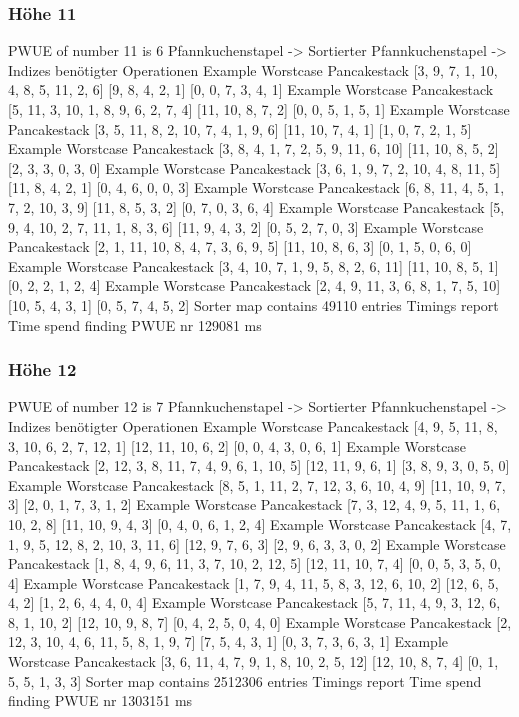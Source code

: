 {    \subsubsection{Höhe 11}

    PWUE of number 11 is 6
    Pfannkuchenstapel -> Sortierter Pfannkuchenstapel -> Indizes benötigter Operationen
Example Worstcase Pancakestack
    [3, 9, 7, 1, 10, 4, 8, 5, 11, 2, 6]
    [9, 8, 4, 2, 1]
    [0, 0, 7, 3, 4, 1]
    Example Worstcase Pancakestack
    [5, 11, 3, 10, 1, 8, 9, 6, 2, 7, 4]
    [11, 10, 8, 7, 2]
    [0, 0, 5, 1, 5, 1]
    Example Worstcase Pancakestack
    [3, 5, 11, 8, 2, 10, 7, 4, 1, 9, 6]
    [11, 10, 7, 4, 1]
    [1, 0, 7, 2, 1, 5]
    Example Worstcase Pancakestack
    [3, 8, 4, 1, 7, 2, 5, 9, 11, 6, 10]
    [11, 10, 8, 5, 2]
    [2, 3, 3, 0, 3, 0]
    Example Worstcase Pancakestack
    [3, 6, 1, 9, 7, 2, 10, 4, 8, 11, 5]
    [11, 8, 4, 2, 1]
    [0, 4, 6, 0, 0, 3]
    Example Worstcase Pancakestack
    [6, 8, 11, 4, 5, 1, 7, 2, 10, 3, 9]
    [11, 8, 5, 3, 2]
    [0, 7, 0, 3, 6, 4]
    Example Worstcase Pancakestack
    [5, 9, 4, 10, 2, 7, 11, 1, 8, 3, 6]
    [11, 9, 4, 3, 2]
    [0, 5, 2, 7, 0, 3]
    Example Worstcase Pancakestack
    [2, 1, 11, 10, 8, 4, 7, 3, 6, 9, 5]
    [11, 10, 8, 6, 3]
    [0, 1, 5, 0, 6, 0]
    Example Worstcase Pancakestack
    [3, 4, 10, 7, 1, 9, 5, 8, 2, 6, 11]
    [11, 10, 8, 5, 1]
    [0, 2, 2, 1, 2, 4]
    Example Worstcase Pancakestack
    [2, 4, 9, 11, 3, 6, 8, 1, 7, 5, 10]
    [10, 5, 4, 3, 1]
    [0, 5, 7, 4, 5, 2]
    Sorter map contains 49110 entries
    Timings report
    Time spend finding PWUE nr 129081 ms
    \subsubsection{Höhe 12}

    PWUE of number 12 is 7
    Pfannkuchenstapel -> Sortierter Pfannkuchenstapel -> Indizes benötigter Operationen
Example Worstcase Pancakestack
    [4, 9, 5, 11, 8, 3, 10, 6, 2, 7, 12, 1]
    [12, 11, 10, 6, 2]
    [0, 0, 4, 3, 0, 6, 1]
    Example Worstcase Pancakestack
    [2, 12, 3, 8, 11, 7, 4, 9, 6, 1, 10, 5]
    [12, 11, 9, 6, 1]
    [3, 8, 9, 3, 0, 5, 0]
    Example Worstcase Pancakestack
    [8, 5, 1, 11, 2, 7, 12, 3, 6, 10, 4, 9]
    [11, 10, 9, 7, 3]
    [2, 0, 1, 7, 3, 1, 2]
    Example Worstcase Pancakestack
    [7, 3, 12, 4, 9, 5, 11, 1, 6, 10, 2, 8]
    [11, 10, 9, 4, 3]
    [0, 4, 0, 6, 1, 2, 4]
    Example Worstcase Pancakestack
    [4, 7, 1, 9, 5, 12, 8, 2, 10, 3, 11, 6]
    [12, 9, 7, 6, 3]
    [2, 9, 6, 3, 3, 0, 2]
    Example Worstcase Pancakestack
    [1, 8, 4, 9, 6, 11, 3, 7, 10, 2, 12, 5]
    [12, 11, 10, 7, 4]
    [0, 0, 5, 3, 5, 0, 4]
    Example Worstcase Pancakestack
    [1, 7, 9, 4, 11, 5, 8, 3, 12, 6, 10, 2]
    [12, 6, 5, 4, 2]
    [1, 2, 6, 4, 4, 0, 4]
    Example Worstcase Pancakestack
    [5, 7, 11, 4, 9, 3, 12, 6, 8, 1, 10, 2]
    [12, 10, 9, 8, 7]
    [0, 4, 2, 5, 0, 4, 0]
    Example Worstcase Pancakestack
    [2, 12, 3, 10, 4, 6, 11, 5, 8, 1, 9, 7]
    [7, 5, 4, 3, 1]
    [0, 3, 7, 3, 6, 3, 1]
    Example Worstcase Pancakestack
    [3, 6, 11, 4, 7, 9, 1, 8, 10, 2, 5, 12]
    [12, 10, 8, 7, 4]
    [0, 1, 5, 5, 1, 3, 3]
    Sorter map contains 2512306 entries
    Timings report
    Time spend finding PWUE nr 1303151 ms
}
